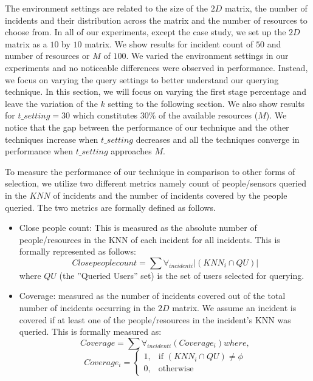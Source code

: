 \documentclass{acm_proc_article-sp}
\begin{document}
The environment settings are related to the size of the $2D$ matrix, the number of incidents and their distribution across the matrix and the number of resources to choose from. In all of our experiments, except the case study, we set up the $2D$ matrix as a $10$ by $10$ matrix. We show results for incident count of $50$ and  number of resources or $M$ of $100$. We varied the environment settings in our experiments and no noticeable differences were observed in performance. Instead, we focus on varying the query settings to better understand our querying technique. In this section, we will focus on varying the first stage percentage and leave the variation of the $k$ setting to the following section. We also show results for $t\_setting = 30$ which constitutes $30\%$ of the available resources ($M$). We notice that the gap between the performance of our technique and the other techniques increase when $t\_setting$ decreases and all the techniques converge in performance when $t\_setting$ approaches $M$. \par
  
 To measure the performance of our technique in comparison to other forms of selection, we utilize two different metrics namely count of people/sensors queried in the $KNN$ of incidents and the number of incidents covered by the people queried. The two metrics are formally defined as follows.
 \begin{itemize}
 \item Close people count: This is measured as the absolute number of people/resources in the KNN of each incident for all incidents. This is formally represented as follows:
 \begin{equation}
 Close people count = \sum \forall_{incident i} |(KNN_i \cap {QU})|
 \end{equation}
 where $QU$ (the ''Queried Users'' set) is the set of users selected for querying. 
 \item Coverage: measured as the number of incidents covered out of the total number of incidents occurring in the $2D$ matrix. We assume an incident is covered if at least one of the people/resources in the incident's KNN was queried. This is formally measured as:
 \begin{equation}
Coverage = \sum \forall_{incident i} (Coverage_i) where,
 \end{equation}
 \[
    Coverage_i = 
\begin{cases}
    1,& \text{if }(KNN_i \cap {QU}) \neq \phi\\
    0,              & \text{otherwise}
\end{cases}
\]
\end{itemize}  
\end{document}
